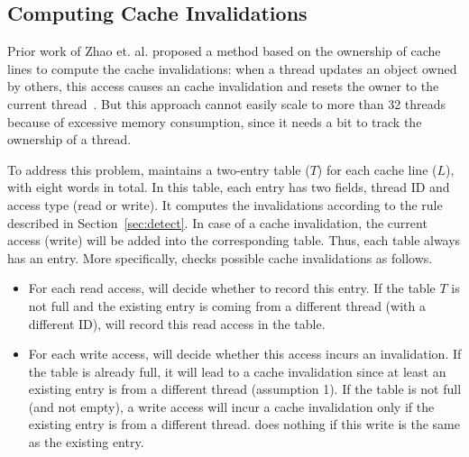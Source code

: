 \subsection{Computing Cache Invalidations}
\label{sec:computeinvalidations}

Prior work of Zhao et. al. proposed a method based on the ownership of cache lines to compute the cache invalidations: when a thread updates an object owned by others, this access causes an cache invalidation and resets the owner to the current thread~\cite{qinzhao}. But this approach cannot easily scale to more than 32 threads because of excessive memory consumption, since it needs a bit to track the ownership of a thread.  

To address this problem, \Cheetah{} maintains a two-entry table ($T$) for each cache line ($L$), with eight words in total. In this table, each entry has two fields, thread ID and access type (read or write). It computes the invalidations according to the rule described in Section~\ref{sec:detect}. In case of a cache invalidation, the current access (write) will be added into the corresponding table. Thus, each table always has an entry. More specifically, \cheetah{} checks possible cache invalidations as follows.

\begin{itemize}
\item
For each read access, \cheetah{} will decide whether to record this entry. If the table $T$ is not full and the existing entry is coming from a different thread (with a different ID), \cheetah{} will record this read access in the table.
  
  \item
  For each write access, \cheetah{} will decide whether this access incurs an invalidation. If the table is already full, it will lead to a cache invalidation since at least an existing entry is from a different thread (assumption 1). If the table is not full (and not empty), a write access will incur a cache invalidation only if the existing entry is from a different thread. \cheetah{} does nothing if this write is the same as the existing entry. 
  
\end{itemize}
     
